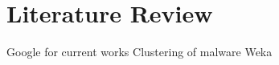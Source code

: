 \chapter{Literature Review}\label{chapter:literature_review}
	Google for current works
	Clustering of malware
	Weka